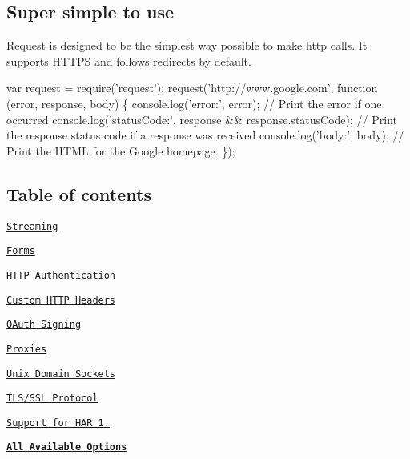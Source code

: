 \href{https://nodei.co/npm/request/}{\tt }

\href{https://travis-ci.org/request/request}{\tt } \href{https://codecov.io/github/request/request?branch=master}{\tt } \href{https://coveralls.io/r/request/request}{\tt } \href{https://david-dm.org/request/request}{\tt } \href{https://snyk.io/test/npm/request}{\tt } \href{https://gitter.im/request/request?utm_source=badge}{\tt }

\subsection*{Super simple to use}

Request is designed to be the simplest way possible to make http calls. It supports H\+T\+T\+PS and follows redirects by default.


\begin{DoxyCode}
var request = require('request');
request('http://www.google.com', function (error, response, body) \{
  console.log('error:', error); // Print the error if one occurred
  console.log('statusCode:', response && response.statusCode); // Print the response status code if a
       response was received
  console.log('body:', body); // Print the HTML for the Google homepage.
\});
\end{DoxyCode}


\subsection*{Table of contents}


\begin{DoxyItemize}
\item \href{#streaming}{\tt Streaming}
\item \href{#forms}{\tt Forms}
\item \href{#http-authentication}{\tt H\+T\+TP Authentication}
\item \href{#custom-http-headers}{\tt Custom H\+T\+TP Headers}
\item \href{#oauth-signing}{\tt O\+Auth Signing}
\item \href{#proxies}{\tt Proxies}
\item \href{#unix-domain-sockets}{\tt Unix Domain Sockets}
\item \href{#tlsssl-protocol}{\tt T\+L\+S/\+S\+SL Protocol}
\item \href{#support-for-har-12}{\tt Support for H\+AR 1.}
\item \href{#requestoptions-callback}{\tt {\bfseries All Available Options}}
\end{DoxyItemize}

